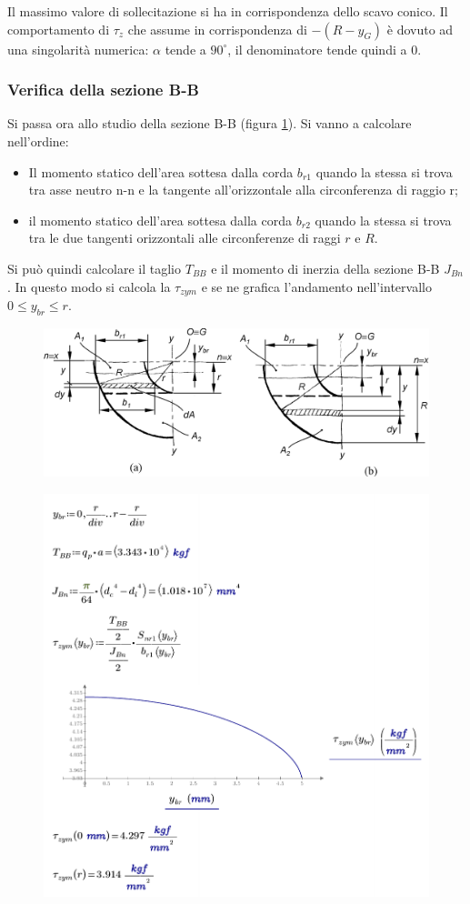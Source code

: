 Il massimo valore di sollecitazione si ha in corrispondenza dello scavo conico. Il comportamento di $\tau_z$ che assume in corrispondenza di $-(R-y_G)$ è dovuto ad una singolarità numerica: $\alpha$ tende a $90^\circ$, il denominatore tende quindi a $0$. 

\subsubsection{Verifica della sezione B-B}
Si passa ora allo studio della sezione B-B (figura \ref{fig:SezAsse13}). Si vanno a calcolare nell'ordine:
\begin{itemize}
\item Il momento statico dell'area sottesa dalla corda $b_{r1}$ quando la stessa si trova tra asse neutro n-n e la tangente all'orizzontale alla circonferenza di raggio r;
\item il momento statico dell'area sottesa dalla corda $b_{r2}$ quando la stessa si trova tra le due tangenti orizzontali alle circonferenze di raggi $r$ e $R$.
\end{itemize}
Si può quindi calcolare il taglio $T_{BB}$ e il momento di inerzia della sezione B-B $J_{Bn}$. In questo modo si calcola la $\tau_{zym}$ e se ne grafica l'andamento nell'intervallo $0 \leq y_{br} \leq r$.
\begin{figure}[H]
\centering
  \includegraphics[width=.7\textwidth]{imgs/Cap7/SezAsse13}
\caption{}
\label{fig:SezAsse13}
\end{figure}
\begin{figure}[H]
\centering
  \includegraphics[width=.65\textwidth]{imgs/MathAsse7}
\caption{}
\label{fig:MathAsse7}
\end{figure}
